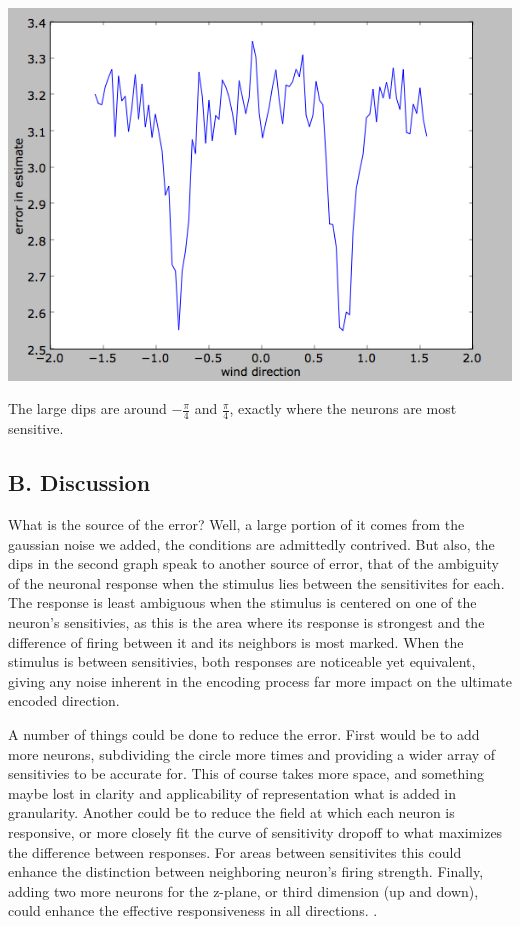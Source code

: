\documentclass[12pt]{article}
\begin{document}
\vspace{15pt}
\includegraphics[scale=0.5]{estimationerror.png}
\vspace{5pt}

The large dips are around $-\frac{\pi}{4}$ and $\frac{\pi}{4}$, exactly where the neurons are most sensitive.  

\subsection{B. Discussion}

What is the source of the error?  Well, a large portion of it comes from the gaussian noise we added, the conditions are admittedly contrived.  But also, the dips in the second graph speak to another source of error, that of the ambiguity of the neuronal response when the stimulus lies between the sensitivites for each.  The response is least ambiguous when the stimulus is centered on one of the neuron's sensitivies, as this is the area where its response is strongest and the difference of firing between it and its neighbors is most marked.  When the stimulus is between sensitivies, both responses are noticeable yet equivalent, giving any noise inherent in the encoding process far more impact on the ultimate encoded direction.  

A number of things could be done to reduce the error.  First would be to add more neurons, subdividing the circle more times and providing a wider array of sensitivies to be accurate for.  This of course takes more space, and something maybe lost in clarity and applicability of representation what is added in granularity.  Another could be to reduce the field at which each neuron is responsive, or more closely fit the curve of sensitivity dropoff to what maximizes the difference between responses.  For areas between sensitivites this could enhance the distinction between neighboring neuron's firing strength.  Finally, adding two more neurons for the z-plane, or third dimension (up and down), could enhance the effective responsiveness in all directions.   .
\end{document}
